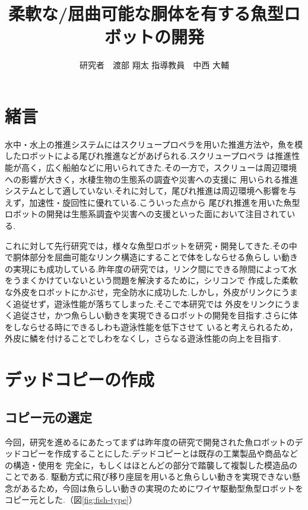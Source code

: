 \documentclass{jarticle}
\begin{document}

\title{
柔軟な/屈曲可能な胴体を有する魚型ロボットの開発
}
\author{
研究者　渡部 翔太\;\;\;
指導教員　中西 大輔
}

\maketitle

\thispagestyle{empty}  %

\section{緒言}

水中・水上の推進システムにはスクリュープロペラを用いた推進方法や，魚を模したロボットによる尾びれ推進などがあげられる.スクリュープロペラ
は推進性能が高く，広く船舶などに用いられてきた.その一方で，スクリューは周辺環境への影響が大きく，水棲生物の生態系の調査や災害への支援に
用いられる推進システムとして適していない.それに対して，尾びれ推進は周辺環境へ影響を与えず，加速性・旋回性に優れている.こういった点から
尾びれ推進を用いた魚型ロボットの開発は生態系調査や災害への支援といった面において注目されている.

これに対して先行研究では，様々な魚型ロボットを研究・開発してきた.その中で胴体部分を屈曲可能なリンク構造にすることで体をしならせる魚らし
い動きの実現にも成功している.昨年度の研究では，リンク間にできる隙間によって水をうまくかけていないという問題を解決するために，シリコンで
作成した柔軟な外皮をロボットにかぶせ，完全防水に成功した.しかし，外皮がリンクにうまく追従せず，遊泳性能が落ちてしまった.そこで本研究では
外皮をリンクにうまく追従させ，かつ魚らしい動きを実現できるロボットの開発を目指す.さらに体をしならせる時にできるしわも遊泳性能を低下させて
いると考えられるため，外皮に鱗を付けることでしわをなくし，さらなる遊泳性能の向上を目指す.

\vspace*{-1mm}
\section{デッドコピーの作成}
\subsection{コピー元の選定}
今回，研究を進めるにあたってまずは昨年度の研究で開発された魚ロボットのデッドコピーを作成することにした.デッドコピーとは既存の工業製品や商品などの構造・使用を
完全に，もしくはほとんどの部分で踏襲して複製した模造品のことである.
駆動方式に飛び移り座屈を用いると魚らしい動きを実現できない懸念があるため，今回は魚らしい動きの実現のためにワイヤ駆動型魚型ロボットをコピー元とした.（図\ref{fig:fish-type}）
\end{document}
